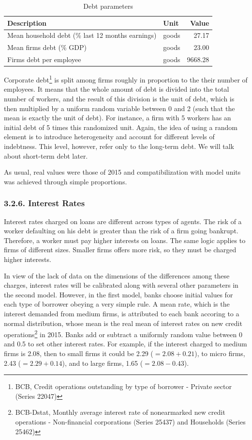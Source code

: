 \documentclass[11pt,]{article}
\begin{document}
\begin{table}

\caption{\label{tab:unnamed-chunk-22}\label{tab:debt}Debt parameters}
\centering
\begin{tabular}[t]{llr}
\toprule
Description & Unit & Value\\
\midrule
Mean household debt (\% last 12 months earnings) & goods & 27.17\\
Mean firms debt (\% GDP) & goods & 23.00\\
Firms debt per employee & goods & 9668.28\\
\bottomrule
\end{tabular}
\end{table}

Corporate debt\footnote{BCB, Credit operations outstanding by type of
  borrower - Private sector (Series 22047)} is split among firms roughly
in proportion to the their number of employees. It means that the whole
amount of debt is divided into the total number of workers, and the
result of this division is the unit of debt, which is then multiplied by
a uniform random variable between 0 and 2 (such that the mean is exactly
the unit of debt). For instance, a firm with 5 workers has an initial
debt of 5 times this randomized unit. Again, the idea of using a random
element is to introduce heterogeneity and account for different levels
of indebtness. This level, however, refer only to the long-term debt. We
will talk about short-term debt later.

As usual, real values were those of 2015 and compatibilization with
model units was achieved through simple proportions.

\subsubsection{3.2.6. Interest Rates}\label{interest-rates}

Interest rates charged on loans are different across types of agents.
The risk of a worker defaulting on his debt is greater than the risk of
a firm going bankrupt. Therefore, a worker must pay higher interests on
loans. The same logic applies to firms of different sizes. Smaller firms
offers more risk, so they must be charged higher interests.

In view of the lack of data on the dimensions of the differences among
these charges, interest rates will be calibrated along with several
other parameters in the second model. However, in the first model, banks
choose initial values for each type of borrower obeying a very simple
rule. A mean rate, which is the interest demanded from medium firms, is
attributed to each bank accoring to a normal distribution, whose mean is
the real mean of interest rates on new credit operations\footnote{BCB-Dstat,
  Monthly average interest rate of nonearmarked new credit operations -
  Non-financial corporations (Series 25437) and Households (Series
  25462)} in 2015. Banks add or subtract a uniformly random value
between 0 and 0.5 to set other interest rates. For example, if the
interest charged to medium firms is 2.08, then to small firms it could
be 2.29 (\(= 2.08 + 0.21\)), to micro firms, 2.43 (\(= 2.29 + 0.14\)),
and to large firms, 1.65 (\(= 2.08 - 0.43\)).
\end{document}
